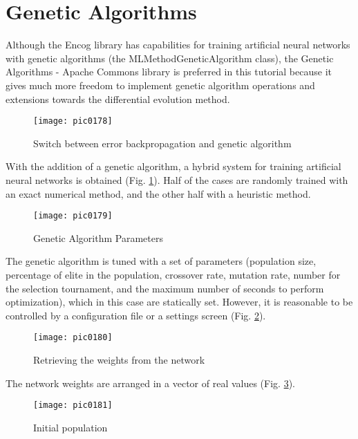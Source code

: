 \section{Genetic Algorithms}

Although the Encog library has capabilities for training artificial neural networks with genetic algorithms (the MLMethodGeneticAlgorithm class), the Genetic Algorithms - Apache Commons library is preferred in this tutorial because it gives much more freedom to implement genetic algorithm operations and extensions towards the differential evolution method.

\begin{figure}[h]
\centering
\texttt{[image: pic0178]}
\caption{Switch between error backpropagation and genetic algorithm}
\label{fig:pic0178}
\end{figure}
\FloatBarrier

With the addition of a genetic algorithm, a hybrid system for training artificial neural networks is obtained (Fig. \ref{fig:pic0178}). Half of the cases are randomly trained with an exact numerical method, and the other half with a heuristic method.

\begin{figure}[h]
\centering
\texttt{[image: pic0179]}
\caption{Genetic Algorithm Parameters}
\label{fig:pic0179}
\end{figure}
\FloatBarrier

The genetic algorithm is tuned with a set of parameters (population size, percentage of elite in the population, crossover rate, mutation rate, number for the selection tournament, and the maximum number of seconds to perform optimization), which in this case are statically set. However, it is reasonable to be controlled by a configuration file or a settings screen (Fig. \ref{fig:pic0179}).

\begin{figure}[h]
\centering
\texttt{[image: pic0180]}
\caption{Retrieving the weights from the network}
\label{fig:pic0180}
\end{figure}
\FloatBarrier

The network weights are arranged in a vector of real values (Fig. \ref{fig:pic0180}).

\begin{figure}[h]
\centering
\texttt{[image: pic0181]}
\caption{Initial population}
\label{fig:pic0181}
\end{figure}
\FloatBarrier

